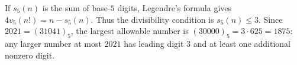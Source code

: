 If $s_5(n)$ is the sum of base-$5$ digits, Legendre's formula gives $4v_5(n!)=n-s_5(n)$. Thus the divisibility condition is $s_5(n)\le3$. Since $2021=(31041)_5$, the largest allowable number is $(30000)_5=3\cdot625=\boxed{1875}$: any larger number at most $2021$ has leading digit $3$ and at least one additional nonzero digit.
